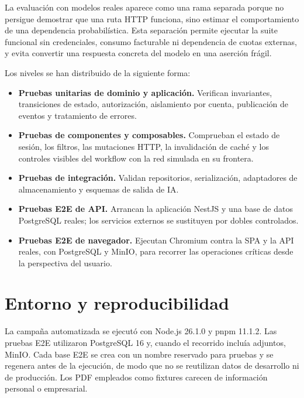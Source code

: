 La evaluación con modelos reales aparece como una rama separada porque no
persigue demostrar que una ruta HTTP funciona, sino estimar el comportamiento
de una dependencia probabilística. Esta separación permite ejecutar la suite
funcional sin credenciales, consumo facturable ni dependencia de cuotas
externas, y evita convertir una respuesta concreta del modelo en una aserción
frágil.

Los niveles se han distribuido de la siguiente forma:

\begin{itemize}
  \item \textbf{Pruebas unitarias de dominio y aplicación.} Verifican
  invariantes, transiciones de estado, autorización, aislamiento por cuenta,
  publicación de eventos y tratamiento de errores.
  \item \textbf{Pruebas de componentes y composables.} Comprueban el estado de
  sesión, los filtros, las mutaciones HTTP, la invalidación de caché y los
  controles visibles del workflow con la red simulada en su frontera.
  \item \textbf{Pruebas de integración.} Validan repositorios, serialización,
  adaptadores de almacenamiento y esquemas de salida de IA.
  \item \textbf{Pruebas E2E de API.} Arrancan la aplicación NestJS y una base de
  datos PostgreSQL reales; los servicios externos se sustituyen por dobles
  controlados.
  \item \textbf{Pruebas E2E de navegador.} Ejecutan Chromium contra la SPA y la
  API reales, con PostgreSQL y MinIO, para recorrer las operaciones críticas
  desde la perspectiva del usuario.
\end{itemize}

\section{Entorno y reproducibilidad}
\label{sec:testing-environment}

La campaña automatizada se ejecutó con Node.js 26.1.0 y pnpm 11.1.2. Las
pruebas E2E utilizaron PostgreSQL 16 y, cuando el recorrido incluía adjuntos,
MinIO. Cada base E2E se crea con un nombre reservado para pruebas y se regenera
antes de la ejecución, de modo que no se reutilizan datos de desarrollo ni de
producción. Los PDF empleados como fixtures carecen de información personal o
empresarial.

